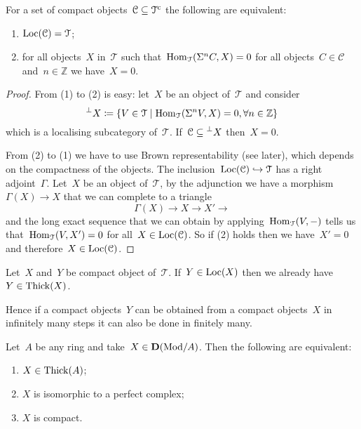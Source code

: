 \documentclass[10pt,a4paper]{article}
\begin{document}
\begin{proposition}
  For a set of compact objects~$\mathcal{C}\subseteq\mathcal{T}^{\mathrm{c}}$ the following are equivalent:
  \begin{enumerate}
    \item $\operatorname{Loc}(\mathcal{C})=\mathcal{T}$;
    \item for all objects~$X$ in~$\mathcal{T}$ such that~$\operatorname{Hom}_{\mathcal{T}}(\Sigma^nC,X)=0$ for all objects~$C\in\mathcal{C}$ and~$n\in\mathbb{Z}$ we have~$X=0$.
  \end{enumerate}

  \begin{proof}
    From (1) to (2) is easy: let~$X$ be an object of~$\mathcal{T}$ and consider
    \begin{equation}
      \prescript{\perp}{}{X}\coloneqq\left\{ V\in\mathcal{T}\mid\operatorname{Hom}_{\mathcal{T}}(\Sigma^nV,X)=0,\forall n\in\mathbb{Z} \right\}
    \end{equation}
    which is a localising subcategory of~$\mathcal{T}$. If~$\mathcal{C}\subseteq\prescript{\perp}{}{X}$ then~$X=0$.

    From (2) to (1) we have to use Brown representability (see later), which depends on the compactness of the objects. The inclusion~$\operatorname{Loc}(\mathcal{C})\hookrightarrow\mathcal{T}$ has a right adjoint~$\Gamma$. Let~$X$ be an object of~$\mathcal{T}$, by the adjunction we have a morphism~$\Gamma(X)\to X$ that we can complete to a triangle
    \begin{equation}
      \Gamma(X)\to X\to X'\to
    \end{equation}
    and the long exact sequence that we can obtain by applying~$\operatorname{Hom}_{\mathcal{T}}(V,-)$ tells us that~$\operatorname{Hom}_{\mathcal{T}}(V,X')=0$ for all~$X\in\operatorname{Loc}(\mathcal{C})$. So if (2) holds then we have~$X'=0$ and therefore~$X\in\operatorname{Loc}(\mathcal{C})$.%
  \end{proof}
\end{proposition}
\begin{proposition}
  Let~$X$ and~$Y$ be compact object of~$\mathcal{T}$. If~$Y\in\operatorname{Loc}(X)$ then we already have~$Y\in\operatorname{Thick}(X)$.
\end{proposition}
Hence if a compact objects~$Y$ can be obtained from a compact objects~$X$ in infinitely many steps it can also be done in finitely many.
\begin{example}
  Let~$A$ be any ring and take~$X\in\mathbf{D}(\mathrm{Mod}/A)$. Then the following are equivalent:
  \begin{enumerate}
    \item $X\in\operatorname{Thick}(A)$;
    \item $X$ is isomorphic to a perfect complex;
    \item $X$ is compact.
  \end{enumerate}
\end{example}
\end{document}
